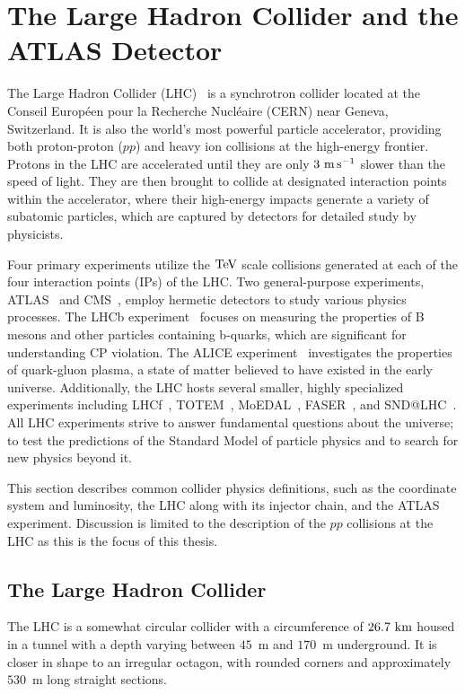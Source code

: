 
\chapter{The Large Hadron Collider and the ATLAS Detector}
\label{ch:lhc_atlas_detector}

The Large Hadron Collider (LHC)~\cite{LHCMachine,LHC1,LHC2, LHC3} is a synchrotron collider located at the Conseil Européen pour la Recherche Nucléaire (CERN) near Geneva, Switzerland.
It is also the world's most powerful particle accelerator, providing both proton-proton ($pp$) and heavy ion collisions at the high-energy frontier.
Protons in the LHC are accelerated until they are only $3~\mps$ slower than the speed of light.
They are then brought to collide at designated interaction points within the accelerator, where their high-energy impacts generate a variety of subatomic particles, which are captured by detectors for detailed study by physicists.

Four primary experiments utilize the $\TeV$ scale collisions generated at each of the four interaction points (IPs) of the LHC.
Two general-purpose experiments, ATLAS~\cite{ATLAS} and CMS~\cite{CMS}, employ hermetic detectors to study various physics processes.
The LHCb experiment~\cite{LHCb} focuses on measuring the properties of B mesons and other particles containing b-quarks, which are significant for understanding CP violation.
The ALICE experiment~\cite{ALICE} investigates the properties of quark-gluon plasma, a state of matter believed to have existed in the early universe.
Additionally, the LHC hosts several smaller, highly specialized experiments including LHCf~\cite{LHCf}, TOTEM~\cite{TOTEM}, MoEDAL~\cite{MoEDAL}, FASER~\cite{FASER}, and SND@LHC~\cite{SNDLHC}.
All LHC experiments strive to answer fundamental questions about the universe; to test the predictions of the Standard Model of particle physics and to search for new physics beyond it.

This section describes common collider physics definitions, such as the coordinate system and luminosity,
the LHC along with its injector chain, and the ATLAS experiment.
Discussion is limited to the description of the $pp$ collisions at the LHC as this is the focus of this thesis.

\section{The Large Hadron Collider}

The LHC is a somewhat circular collider with a circumference of $26.7~\km$ housed in a tunnel with a depth varying between $45$~m and $170$~m underground.
It is closer in shape to an irregular octagon, with rounded corners and approximately $530$~m long straight sections.

